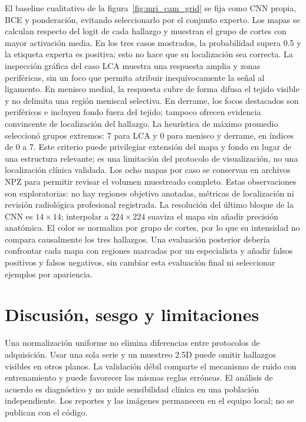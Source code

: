 El baseline cualitativo de la figura~\ref{fig:mri_cam_grid} se fija como CNN propia, BCE y ponderación, evitando seleccionarlo por el conjunto experto.
Los mapas se calculan respecto del logit de cada hallazgo y muestran el grupo de cortes con mayor activación media.
En los tres casos mostrados, la probabilidad supera 0.5 y la etiqueta experta es positiva;
esto no hace que su localización sea correcta. La inspección gráfica del caso LCA muestra una
respuesta amplia y zonas periféricas, sin un foco que permita atribuir inequívocamente la señal al ligamento.
En menisco medial, la respuesta cubre de forma difusa el tejido visible y no delimita una región
meniscal selectiva. En derrame, los focos destacados son periféricos e incluyen fondo fuera del tejido;
tampoco ofrecen evidencia convincente de localización del hallazgo.
La heurística de máximo promedio seleccionó grupos extremos: 7 para LCA y 0 para menisco y derrame,
en índices de 0 a 7. Este criterio puede privilegiar extensión del mapa y fondo en lugar de una
estructura relevante; es una limitación del protocolo de visualización, no una localización clínica validada.
Los ocho mapas por caso se conservan en archivos NPZ para permitir revisar el volumen muestreado completo.
Estas observaciones son exploratorias: no hay regiones objetivo anotadas, métricas de localización ni
revisión radiológica profesional registrada. La resolución del último bloque de la CNN es $14\times14$;
interpolar a $224\times224$ suaviza el mapa sin añadir precisión anatómica. El color se normaliza por
grupo de cortes, por lo que su intensidad no compara causalmente los tres hallazgos. Una evaluación
posterior debería confrontar cada mapa con regiones marcadas por un especialista y añadir falsos positivos
y falsos negativos, sin cambiar esta evaluación final ni seleccionar ejemplos por apariencia.

\section{Discusión, sesgo y limitaciones}

Una normalización uniforme no elimina diferencias entre protocolos de adquisición.
Usar una sola serie y un muestreo 2.5D puede omitir hallazgos visibles en otros planos.
La validación débil comparte el mecanismo de ruido con entrenamiento y puede favorecer las mismas reglas erróneas.
El análisis de acuerdo es diagnóstico y no mide sensibilidad clínica en una población independiente.
Los reportes y las imágenes permanecen en el equipo local; no se publican con el código.

